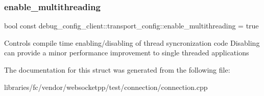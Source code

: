 \subsubsection{\texorpdfstring{enable\+\_\+multithreading}{enable\_multithreading}}
{\footnotesize\ttfamily bool const debug\+\_\+config\+\_\+client\+::transport\+\_\+config\+::enable\+\_\+multithreading = true\hspace{0.3cm}{\ttfamily [static]}}

Controls compile time enabling/disabling of thread syncronization code Disabling can provide a minor performance improvement to single threaded applications 

The documentation for this struct was generated from the following file\+:\begin{DoxyCompactItemize}
\item 
libraries/fc/vendor/websocketpp/test/connection/connection.\+cpp\end{DoxyCompactItemize}
